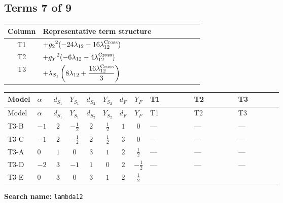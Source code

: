 \documentclass[8pt]{article}
\begin{document}
\begin{landscape}
\subsection*{Terms 7 of 9}
\begin{center}
\begin{tabular}{@{}c >{\raggedright\arraybackslash}p{0.82\linewidth}@{}}
\toprule
Column & Representative term structure \\
\midrule
T1 & \(\displaystyle +{g_2}^2 (-24 {\lambda_{12}}-16 {\lambda_{12}^{\rm Cross}})\) \\
\midrule
T2 & \(\displaystyle +{g_Y}^2 (-6 {\lambda_{12}}-4 {\lambda_{12}^{\rm Cross}})\) \\
\midrule
T3 & \(\displaystyle +{\lambda_{S_1}} \left(8 {\lambda_{12}}+\frac{16 {\lambda_{12}^{\rm Cross}}}{3}\right)\) \\
\midrule
\bottomrule
\end{tabular}
\end{center}
\smallskip
\tiny
\begin{longtable}{@{}llcccccc >{\raggedright\arraybackslash}p{0.21\linewidth} >{\raggedright\arraybackslash}p{0.21\linewidth} >{\raggedright\arraybackslash}p{0.21\linewidth}@{}}
\toprule
Model & $\alpha$ & $d_{S_1}$ & $Y_{S_1}$ & $d_{S_2}$ & $Y_{S_2}$ & $d_F$ & $Y_F$ & T1 & T2 & T3 \\
\midrule
\endfirsthead
\toprule
Model & $\alpha$ & $d_{S_1}$ & $Y_{S_1}$ & $d_{S_2}$ & $Y_{S_2}$ & $d_F$ & $Y_F$ & T1 & T2 & T3 \\
\midrule
\endhead
T3-B & $-1$ & $2$ & $-\frac{1}{2}$ & $2$ & $\frac{1}{2}$ & $1$ & $0$ & --- & --- & --- \\
\midrule
T3-C & $-1$ & $2$ & $-\frac{1}{2}$ & $2$ & $\frac{1}{2}$ & $3$ & $0$ & --- & --- & --- \\
\midrule
T3-A & $0$ & $1$ & $0$ & $3$ & $1$ & $2$ & $\frac{1}{2}$ & --- & --- & --- \\
\midrule
T3-D & $-2$ & $3$ & $-1$ & $1$ & $0$ & $2$ & $-\frac{1}{2}$ & --- & --- & --- \\
\midrule
T3-E & $0$ & $3$ & $0$ & $3$ & $1$ & $2$ & $\frac{1}{2}$ & \scriptsize\adjustbox{max width=\linewidth}{$\begin{gathered} +{g_2}^2 (-24 {\lambda_{12}}-16 {\lambda_{12}^{\rm Cross}})\end{gathered}$} & \scriptsize\adjustbox{max width=\linewidth}{$\begin{gathered} +{g_Y}^2 (-6 {\lambda_{12}}-4 {\lambda_{12}^{\rm Cross}})\end{gathered}$} & \scriptsize\adjustbox{max width=\linewidth}{$\begin{gathered} +{\lambda_{S_1}} \left(8 {\lambda_{12}}+\frac{16 {\lambda_{12}^{\rm Cross}}}{3}\right)\end{gathered}$} \\
\midrule
\bottomrule
\end{longtable}
\clearpage
\noindent\textbf{Search name: }\texttt{lambda12}\par\smallskip

\end{landscape}
\end{document}
